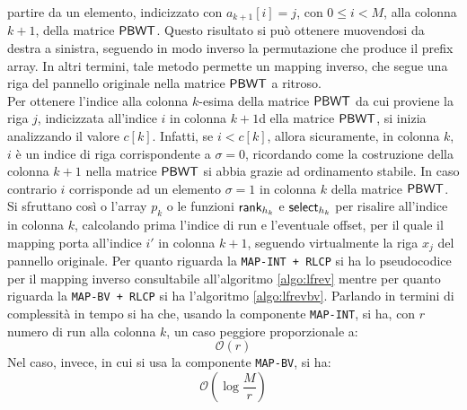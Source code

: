partire da un elemento, indicizzato con $a_{k+1}[i]=j$, con $0\leq i<M$, alla
colonna $k+1$, della 
matrice $\mbox{\rm {\sf PBWT}}$. Questo risultato si può ottenere muovendosi da destra a
sinistra, seguendo in modo 
inverso la permutazione che produce il prefix array. In altri termini,
tale metodo permette un mapping inverso, che segue una riga del
pannello originale nella matrice $\mbox{\rm {\sf PBWT}}$ a ritroso.\\ 
Per ottenere l'indice alla colonna $k$-esima della matrice $\mbox{\rm {\sf PBWT}}$ da cui
proviene la riga $j$, indicizzata all'indice $i$ in
colonna $k+1$d ella matrice $\mbox{\rm {\sf PBWT}}$, si inizia analizzando il valore
$c[k]$. Infatti, se $i<c[k]$, 
allora sicuramente, in colonna $k$, $i$ è un indice di riga corrispondente a
$\sigma=0$, ricordando come la costruzione della colonna $k+1$
nella matrice $\mbox{\rm {\sf PBWT}}$ si abbia grazie ad ordinamento stabile. In caso contrario
$i$ corrisponde ad un elemento $\sigma=1$ in colonna $k$ della matrice $\mbox{\rm {\sf PBWT}}$.
Si sfruttano 
così o l'array $p_k$ o le funzioni 
$\mbox{\rm {\sf rank}}_{h_k}$ e $\mbox{\rm {\sf select}}_{h_k}$ per risalire all'indice in colonna $k$,
calcolando 
prima l'indice di run e l'eventuale offset, per il quale il mapping porta
all'indice $i'$ in colonna $k+1$, seguendo virtualmente la riga $x_j$ del
pannello originale. 
Per quanto riguarda la \texttt{MAP-INT + RLCP} si ha lo pseudocodice per il
mapping inverso consultabile all'algoritmo \ref{algo:lfrev} mentre per quanto
riguarda la \texttt{MAP-BV + RLCP} si ha l'algoritmo
\ref{algo:lfrevbv}. Parlando in termini di complessità in tempo si ha che,
usando la componente \texttt{MAP-INT}, si ha, con $r$ numero di run alla
colonna $k$, un caso peggiore proporzionale a:
\begin{equation}
  \label{eq:revint}
  \mathcal{O}(r)
\end{equation}
Nel caso, invece, in cui si usa la componente \texttt{MAP-BV}, si ha:
\begin{equation}
  \label{eq:revbv}
  \mathcal{O}\left(\log\frac{M}{r}\right)
\end{equation}
